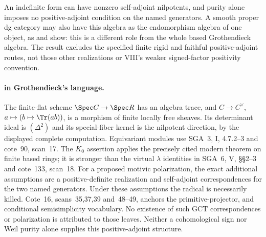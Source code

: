 An indefinite form can have nonzero self-adjoint nilpotents,
and purity alone imposes no positive-adjoint condition on the
named generators. A smooth proper dg category may also have
this algebra as the endomorphism algebra of one object, as
 and  show: this is a different role from the
whole based Grothendieck algebra. The result excludes the
specified finite rigid and faithful positive-adjoint routes,
not those other realizations or VIII's weaker signed-factor
positivity convention.

\paragraph{ in Grothendieck's language.}
The finite-flat scheme $\Spec C\to\Spec R$ has an algebra trace,
and $C\to C^\vee$, $a\mapsto(b\mapsto\Tr(ab))$, is a morphism
of finite locally free sheaves. Its determinant ideal is
$(\Delta^2)$ and its special-fiber kernel is the nilpotent
direction, by the displayed complete computation. Equivariant
modules use SGA~3, I, 4.7.2--3 and cote~90, scan~17.
The $K_0$ assertion applies the precisely cited modern theorem
on finite based rings; it is stronger than the virtual
$\lambda$ identities in SGA~6, V, \S\S2--3 and cote~133,
scan~18. For a proposed motivic polarization, the exact
additional assumptions are a positive-definite realization and
self-adjoint correspondences for the two named generators.
Under these assumptions the radical is necessarily killed.
Cote~16, scans~35,37,39 and~48--49, anchors the primitive-projector,
and conditional semisimplicity vocabulary. No
existence of such GCT correspondences or polarization is
attributed to those leaves. Neither a cohomological sign nor
Weil purity alone supplies this positive-adjoint structure.

